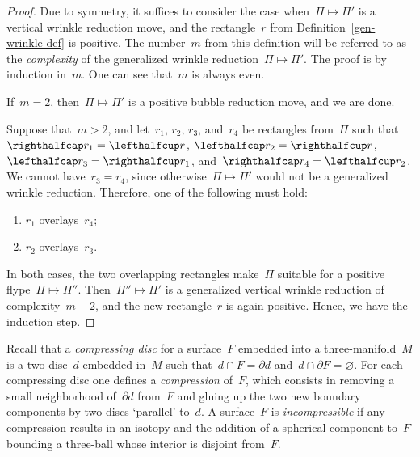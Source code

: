 \documentclass{amsart}
\def\cabl#1{\lefthalfcup#1}
\def\cabr#1{\righthalfcup#1}
\def\catl#1{\lefthalfcap#1}
\def\catr#1{\righthalfcap#1}
\theoremstyle{theorem}
\theoremstyle{remark}
\theoremstyle{definition}
\numberwithin{equation}{section}
\numberwithin{figure}{section}
\begin{document}
\begin{proof}
Due to symmetry, it suffices to consider the case when~$\Pi\mapsto\Pi'$ is a vertical wrinkle reduction move, and the rectangle~$r$ from
Definition~\ref{gen-wrinkle-def} is positive. The number~$m$ from this definition
will be referred to as the \emph{complexity} of the generalized wrinkle reduction~$\Pi\mapsto\Pi'$.
The proof is by induction in~$m$. One can see that~$m$ is always even.

If~$m=2$, then~$\Pi\mapsto\Pi'$ is a positive bubble reduction move, and we are done.

Suppose that~$m>2$, and let~$r_1$, $r_2$, $r_3$, and~$r_4$ be rectangles from~$\Pi$
such that~$\catr r_1=\cabl r$, $\catl r_2=\cabr r$, $\catl r_3=\cabr r_1$, and~$\catr r_4=\cabl r_2$.
We cannot have~$r_3=r_4$, since otherwise~$\Pi\mapsto\Pi'$ would not be a generalized
wrinkle reduction. Therefore, one of the following must hold:
\begin{enumerate}
\item
$r_1$ overlays~$r_4$;
\item
$r_2$ overlays~$r_3$.
\end{enumerate}
In both cases, the two overlapping rectangles make~$\Pi$ suitable for a positive flype~$\Pi\mapsto\Pi''$.
Then~$\Pi''\mapsto\Pi'$ is a generalized vertical wrinkle reduction of complexity~$m-2$,
and the new rectangle~$r$ is again positive. Hence, we have the induction step.
\end{proof}


Recall that a \emph{compressing disc} for a surface~$F$ embedded into a three-manifold~$M$ is
a two-disc~$d$ embedded in~$M$ such that~$d\cap F=\partial d$ and~$d\cap\partial F=\varnothing$.
For each compressing disc one defines a \emph{compression} of~$F$, which consists in removing a small neighborhood of~$\partial d$ from~$F$ and gluing up
the two new boundary components by two-discs `parallel' to~$d$. A surface~$F$ is \emph{incompressible}
if any compression results in an isotopy and the addition of a spherical component to~$F$ bounding a three-ball
whose interior is disjoint from~$F$.
\end{document}
